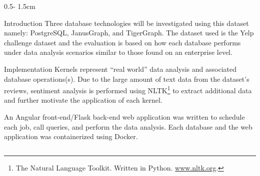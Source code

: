 \documentclass{uioposter}
\begin{document}
\begin{frame}
\begin{columns}[onlytextwidth]
\begin{column}{0.5\textwidth - 1.5cm}
\begin{block}{Introduction}
        Three database technologies will be investigated using this dataset namely: PostgreSQL, JanusGraph, and TigerGraph. The dataset used is the Yelp challenge dataset and the evaluation is based on how each database performs under data analysis scenarios similar to those found on an enterprise level.
    \end{block}



    \begin{block}{Implementation}
        Kernels represent ``real world'' data analysis and associated database operations(s). Due to the large amount of text data from the dataset's reviews, sentiment analysis is performed using NLTK\footnote{The Natural Language Toolkit. Written in Python. \url{www.nltk.org}.} to extract additional data and further motivate the application of each kernel.
        
        An Angular front-end/Flask back-end web application was written to schedule each job, call queries, and perform the data analysis. Each database and the web application was containerized using Docker.
        \begin{figure}
            \centering
            

\end{figure}
\end{block}
\end{column}
\end{columns}
\end{frame}
\end{document}
